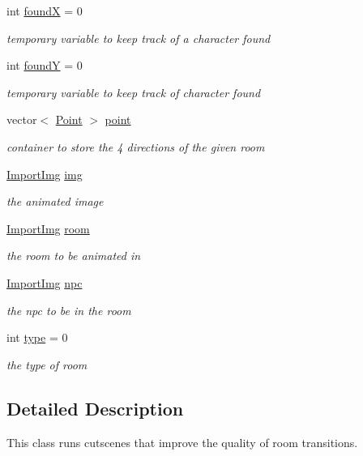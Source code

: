 \begin{DoxyCompactItemize}
int \hyperlink{classCutscene_a829a69db5263fd8e0915a9b905c386d0}{found\-X} = 0
\begin{DoxyCompactList}\small\item\em temporary variable to keep track of a character found \end{DoxyCompactList}\item 
int \hyperlink{classCutscene_ac77c836201afb1a31547c6c930e323d4}{found\-Y} = 0
\begin{DoxyCompactList}\small\item\em temporary variable to keep track of character found \end{DoxyCompactList}\item 
vector$<$ \hyperlink{structCutscene_1_1Point}{Point} $>$ \hyperlink{classCutscene_a7438465af0e7bc51d52ca5aaefc97e3b}{point}
\begin{DoxyCompactList}\small\item\em container to store the 4 directions of the given room \end{DoxyCompactList}\item 
\hyperlink{classImportImg}{Import\-Img} \hyperlink{classCutscene_ae40582568add2f44e099d4a8978f41d4}{img}
\begin{DoxyCompactList}\small\item\em the animated image \end{DoxyCompactList}\item 
\hyperlink{classImportImg}{Import\-Img} \hyperlink{classCutscene_a033c0715f32be9730d3692e57fe17096}{room}
\begin{DoxyCompactList}\small\item\em the room to be animated in \end{DoxyCompactList}\item 
\hyperlink{classImportImg}{Import\-Img} \hyperlink{classCutscene_a85778dff65358df7ddf7a77edeae9b7a}{npc}
\begin{DoxyCompactList}\small\item\em the npc to be in the room \end{DoxyCompactList}\item 
int \hyperlink{classCutscene_ac07858b694eab044576aa40257406e69}{type} = 0
\begin{DoxyCompactList}\small\item\em the type of room \end{DoxyCompactList}\end{DoxyCompactItemize}


\subsection{Detailed Description}
This class runs cutscenes that improve the quality of room transitions. 

